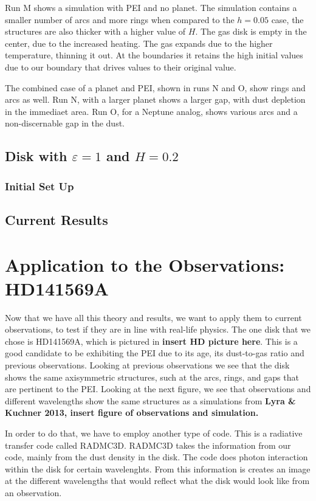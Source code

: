 \documentclass[onecolumn]{report}
\newcommand{\epsi}{\varepsilon}
\begin{document}
Run M shows a simulation with PEI and no planet. The simulation contains a smaller number of arcs and more rings when compared to the $h=0.05$ case, the structures are also thicker with a higher value of $H$. The gas disk is empty in the center, due to the increased heating. The gas expands due to the higher temperature, thinning it out. At the boundaries it retains the high initial values due to our boundary that drives values to their original value.

The combined case of a planet and PEI, shown in runs N and O, show rings and arcs as well. Run N, with a larger planet shows a larger gap, with dust depletion in the immediaet area. Run O, for a Neptune analog, shows various arcs and a non-discernable gap in the dust.

\section{Disk with $\epsi=1$ and $H=0.2$}

\subsection{Initial Set Up}

\section{Current Results}

\chapter{Application to the Observations: HD141569A}

Now that we have all this theory and results, we want to apply them to current observations, to test if they are in line with real-life physics. The one disk that we chose is HD141569A, which is pictured in \textbf{insert HD picture here}. This is a good candidate to be exhibiting the PEI due to its age, its dust-to-gas ratio and previous observations. Looking at previous observations we see that the disk shows the same axisymmetric structures, such at the arcs, rings, and gaps that are pertinent to the PEI. Looking at the next figure, we see that observations and different wavelengths show the same structures as a simulations from \textbf{Lyra \& Kuchner 2013, insert figure of observations and simulation.}



In order to do that, we have to employ another type of code. This is a radiative transfer code called RADMC3D. RADMC3D takes the information from our code, mainly from the dust density in the disk. The code does photon interaction within the disk for certain wavelenghts. From this information is creates an image at the different wavelengths that would reflect what the disk would look like from an observation.
\end{document}
